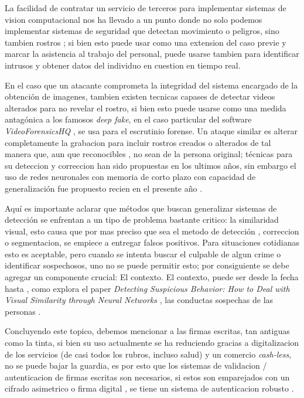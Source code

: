\documentclass[a4paper]{IEEEtranUNT}
\begin{document}
La facilidad de contratar un servicio de terceros para implementar sistemas de vision computacional nos ha llevado a un punto donde no solo podemos implementar sistemas de seguridad que detectan movimiento o peligros, sino tambien rostros \citep{Aydin2017}; si bien esto puede usar como una extension del caso previe y marcar la asistencia al trabajo del personal, puede usarse tambien para identificar intrusos y obtener datos del individuo en cuestion en tiempo real.

En el caso que un atacante comprometa la integridad del sistema encargado de la obtención de imagenes, tambien existen tecnicas capases de detectar videos alterados para no revelar el rostro, si bien esto puede usarse como una medida antagónica a los famosos \textit{deep fake}, en el caso particular del software \textit{VideoForensicsHQ} \citep{fox2020videoforensicshq}, se usa para el escrutinio forense. Un ataque similar es alterar completamente la grabacion para incluir rostros creados o alterados de tal manera que, aun que reconocibles , no sean de la persona original; técnicas para su deteccion y correccion han sido propuestas en los ultimos años, sin embargo el uso de redes neuronales con memoria de corto plazo con capacidad de generalización fue propuesto recien en el presente año \citep{aneja2020generalized}.

Aquí es importante aclarar que métodos que buscan generalizar sistemas de detección se enfrentan a un tipo de problema bastante critico: la similaridad visual, esto causa que por mas preciso que sea el metodo de detección , correccion o segmentacion, se empiece a entregar falsos positivos. Para situaciones cotidianas esto es aceptable, pero cuando se intenta buscar el culpable de algun crime o identificar sospechosos, uno no se puede permitir esto; por consiguiente se debe agregar un componente crucial: El contexto. El contexto, puede ser desde la fecha hasta , como explora el paper \textit{Detecting Suspicious Behavior: How to Deal with Visual Similarity through Neural Networks }, las conductas sospechas de las personas \citep{martnezmascorro2020detecting}.

Concluyendo este topico, debemos mencionar a las firmas escritas, tan antiguas como la tinta, si bien su uso actualmente se ha reduciendo gracias a digitalizacion de los servicios (de casi todos los rubros, incluso salud) y un comercio \textit{cash-less}, no se puede bajar la guardia, es por esto que los sistemas de validacion / autenticacion de firmas escritas son necesarios, si estos son emparejados con un cifrado asimetrico o firma digital , se tiene un sistema de autenticacion robusto \citep{alam2016suis}.
\end{document}
